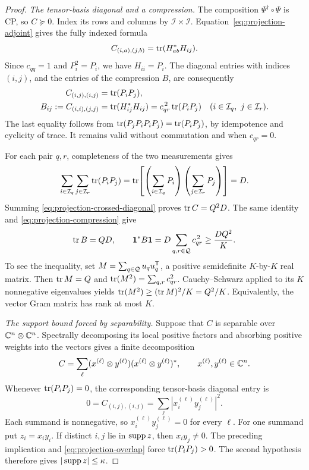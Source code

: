 \begin{proof}
\emph{The tensor-basis diagonal and a compression.}
The composition \(\Psi^\dagger\circ\Psi\) is CP, so \(C\succeq0\).
Index its rows and columns by \(\mathcal I\times\mathcal I\).
Equation~\eqref{eq:projection-adjoint} gives the fully indexed formula
\begin{equation}\label{eq:projection-composite-entries}
 C_{(i,a),(j,b)}=\operatorname{tr}(H_{ab}^*H_{ij}).
\end{equation}
Since \(c_{qq}=1\) and \(P_i^2=P_i\), we have \(H_{ii}=P_i\).
The diagonal entries with indices \((i,j)\), and the entries of the
compression \(B\), are consequently
\begin{align}
 C_{(i,j),(i,j)}&=\operatorname{tr}(P_iP_j),
       \label{eq:projection-crossed-diagonal}\\
 B_{ij}:=C_{(i,i),(j,j)}
   &=\operatorname{tr}(H_{ij}^*H_{ij})
     =c_{qr}^{\,2}\operatorname{tr}(P_iP_j)
       \quad(i\in\mathcal I_q,\ j\in\mathcal I_r).
       \label{eq:projection-compression}
\end{align}
The last equality follows from
\(\operatorname{tr}(P_jP_iP_iP_j)=\operatorname{tr}(P_iP_j)\), by idempotence and cyclicity of
trace.  It remains valid without commutation and when \(c_{qr}=0\).

For each pair \(q,r\), completeness of the two measurements gives
\[
 \sum_{i\in\mathcal I_q}\sum_{j\in\mathcal I_r}\operatorname{tr}(P_iP_j)
 =\operatorname{tr}\!\left[
    \left(\sum_{i\in\mathcal I_q}P_i\right)
    \left(\sum_{j\in\mathcal I_r}P_j\right)
   \right]=D.
\]
Summing \eqref{eq:projection-crossed-diagonal} proves
\(\operatorname{tr} C=Q^2D\).  The same identity and
\eqref{eq:projection-compression} give
\begin{equation}\label{eq:projection-gram-bound}
 \operatorname{tr} B=QD,\qquad
 \mathbf1^*B\mathbf1
   =D\sum_{q,r\in\mathcal Q}c_{qr}^{\,2}
   \geq\frac{DQ^2}{K}.
\end{equation}
To see the inequality, set
\(M=\sum_{q\in\mathcal Q}u_qu_q^{\mathsf T}\), a positive semidefinite
\(K\)-by-\(K\) real matrix.  Then
\(\operatorname{tr} M=Q\) and \(\operatorname{tr}(M^2)=\sum_{q,r}c_{qr}^2\).
Cauchy--Schwarz applied to its \(K\) nonnegative eigenvalues yields
\(\operatorname{tr}(M^2)\geq(\operatorname{tr} M)^2/K=Q^2/K\).  Equivalently, the vector Gram
matrix has rank at most \(K\).

\emph{The support bound forced by separability.}
Suppose that \(C\) is separable over \(\mathbb C^n\otimes\mathbb C^n\).
Spectrally decomposing its local positive factors and absorbing positive
weights into the vectors gives a finite decomposition
\[
 C=\sum_\ell
   (x^{(\ell)}\otimes y^{(\ell)})
   (x^{(\ell)}\otimes y^{(\ell)})^*,
 \qquad x^{(\ell)},y^{(\ell)}\in\mathbb C^n.
\]
Whenever \(\operatorname{tr}(P_iP_j)=0\), the corresponding tensor-basis diagonal entry is
\[
 0=C_{(i,j),(i,j)}
   =\sum_\ell |x_i^{(\ell)}y_j^{(\ell)}|^2.
\]
Each summand is nonnegative, so \(x_i^{(\ell)}y_j^{(\ell)}=0\) for
every \(\ell\).  For one summand put \(z_i=x_i y_i\).
If distinct \(i,j\) lie in \(\operatorname{supp} z\), then \(x_i y_j\ne0\).
The preceding implication and \eqref{eq:projection-overlap} force
\(\operatorname{tr}(P_iP_j)>0\).  The second hypothesis therefore gives
\(|\operatorname{supp} z|\leq\kappa\).


\end{proof}

